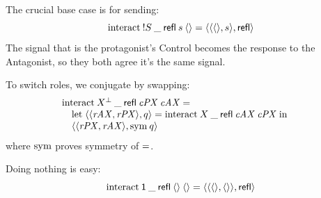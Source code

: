 \documentclass{book}
\newcommand{\C}[1]{\red{\ensuremath{\mathsf{#1}}}}
\newcommand{\F}[1]{\green{\ensuremath{\mathrm{#1}}}}
\newcommand{\N}[1]{\black{\ensuremath{#1}}}
\newcommand{\lett}[3]{\mathrm{let}\;#1 = #2\;\mathrm{in}\; #3}
\newcommand{\vd}{\C{\langle\rangle}}
\newcommand{\pr}[2]{\red{\langle\N{#1},\N{#2}\rangle}}
\begin{document}
The crucial base case is for sending:
\[
\F{interact}\:\send{S}\:\_\:\refl\:s\:\vd = \pr{\pr{\vd}{s}}{\C{refl}}
\]
The signal that is the protagonist's Control becomes the response to the Antagonist, so they both agree it's the same signal.

To switch roles, we conjugate by swapping:
\[\begin{array}{@{}l}
\F{interact}\:\op{X}\:\_\:\refl\:\mathit{cPX}\:\mathit{cAX} = \\ \quad
 \begin{array}[t]{@{}l}
\lett{\pr{\pr{\mathit{rAX}}{\mathit{rPX}}}{q}}{\F{interact}\:X\:\_\:\refl\:\mathit{cAX}\:\mathit{cPX}}
     {\\ \pr{\pr{\mathit{rPX}}{\mathit{rAX}}}{\F{sym}\:q}}
     \end{array}
\end{array}\]
where $\F{sym}$ proves symmetry of $\EQ$.

Doing nothing is easy:
\[
\F{interact}\:\C{1}\:\_\:\refl\:\vd\:\vd = \pr{\pr{\vd}{\vd}}{\C{refl}}
\]
\end{document}
